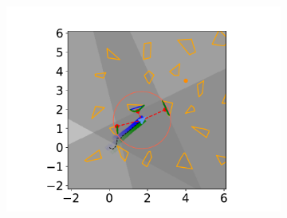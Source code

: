 \begin{figure}[h]
\begin{subfigure}{0.20\textwidth}
        \includegraphics[width=\textwidth]{../figures/Simulations/sim2unkenv/frame_4.pdf}
    \end{subfigure}


\end{figure}
